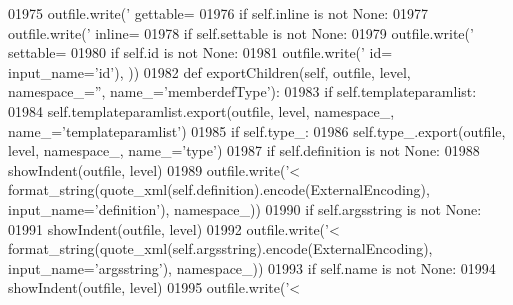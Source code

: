 \begin{DoxyCode}
{{{{{{{{{{{{{{{{{{{{{{{{{{{{{{{{{{{{{{{{{{{{{{{{{{{{{{{{{{{{{{{{{{{{{{{{{{{{{{{{{{{{{{{{{{{{{{{{{{{{{{{{{{{{{{{{{{{{{{{{{{{{{{{{{{{{{01975             outfile.write(\textcolor{stringliteral}{' gettable=%
01976         \textcolor{keywordflow}{if} self.inline \textcolor{keywordflow}{is} \textcolor{keywordflow}{not} \textcolor{keywordtype}{None}:
01977             outfile.write(\textcolor{stringliteral}{' inline=%
01978         \textcolor{keywordflow}{if} self.settable \textcolor{keywordflow}{is} \textcolor{keywordflow}{not} \textcolor{keywordtype}{None}:
01979             outfile.write(\textcolor{stringliteral}{' settable=%
01980         \textcolor{keywordflow}{if} self.id \textcolor{keywordflow}{is} \textcolor{keywordflow}{not} \textcolor{keywordtype}{None}:
01981             outfile.write(\textcolor{stringliteral}{' id=%
      input\_name=\textcolor{stringliteral}{'id'}), ))
01982     \textcolor{keyword}{def }exportChildren(self, outfile, level, namespace\_='', name\_='memberdefType'):
01983         \textcolor{keywordflow}{if} self.templateparamlist:
01984             self.templateparamlist.export(outfile, level, namespace\_, name\_=\textcolor{stringliteral}{'templateparamlist'})
01985         \textcolor{keywordflow}{if} self.type_:
01986             self.type\_.export(outfile, level, namespace\_, name\_=\textcolor{stringliteral}{'type'})
01987         \textcolor{keywordflow}{if} self.definition \textcolor{keywordflow}{is} \textcolor{keywordflow}{not} \textcolor{keywordtype}{None}:
01988             showIndent(outfile, level)
01989             outfile.write(\textcolor{stringliteral}{'<%
      format_string(quote_xml(self.definition).encode(ExternalEncoding), input\_name=\textcolor{stringliteral}{'definition'}), namespace\_))
01990         \textcolor{keywordflow}{if} self.argsstring \textcolor{keywordflow}{is} \textcolor{keywordflow}{not} \textcolor{keywordtype}{None}:
01991             showIndent(outfile, level)
01992             outfile.write(\textcolor{stringliteral}{'<%
      format_string(quote_xml(self.argsstring).encode(ExternalEncoding), input\_name=\textcolor{stringliteral}{'argsstring'}), namespace\_))
01993         \textcolor{keywordflow}{if} self.name \textcolor{keywordflow}{is} \textcolor{keywordflow}{not} \textcolor{keywordtype}{None}:
01994             showIndent(outfile, level)
01995             outfile.write(\textcolor{stringliteral}{'<%
}}}}}}}}}}}}}}}}}}}}}}}}}}}}}}}}}}}}}}}}}}}}}}}}}}}}}}}}}}}}}}}}}}}}}}}}}}}}}}}}}}}}}}}}}}}}}}}}}}}}}}}}}}}}}}}}}}}}}}}}}}}}}}}}}}}}}}}}}}}}
\end{DoxyCode}
